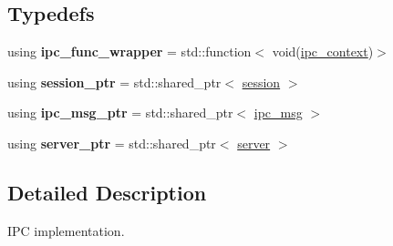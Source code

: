 \subsection*{Typedefs}
\begin{DoxyCompactItemize}
\item 
\mbox{\label{namespaceeka2l1_1_1service_a41efdf40fc6de625fc5932872b0a3954}} 
using {\bfseries ipc\+\_\+func\+\_\+wrapper} = std\+::function$<$ void(\mbox{\hyperlink{structeka2l1_1_1service_1_1ipc__context}{ipc\+\_\+context}})$>$
\item 
\mbox{\label{namespaceeka2l1_1_1service_a58fd4ada58fae6100ad3682121859e77}} 
using {\bfseries session\+\_\+ptr} = std\+::shared\+\_\+ptr$<$ \mbox{\hyperlink{classeka2l1_1_1service_1_1session}{session}} $>$
\item 
\mbox{\label{namespaceeka2l1_1_1service_ac83a1c576300ebfa20146923983dae42}} 
using {\bfseries ipc\+\_\+msg\+\_\+ptr} = std\+::shared\+\_\+ptr$<$ \mbox{\hyperlink{structeka2l1_1_1ipc__msg}{ipc\+\_\+msg}} $>$
\item 
\mbox{\label{namespaceeka2l1_1_1service_ae3ea23c69d212ccd219f25d865028ee7}} 
using {\bfseries server\+\_\+ptr} = std\+::shared\+\_\+ptr$<$ \mbox{\hyperlink{classeka2l1_1_1service_1_1server}{server}} $>$
\end{DoxyCompactItemize}


\subsection{Detailed Description}
I\+PC implementation. 